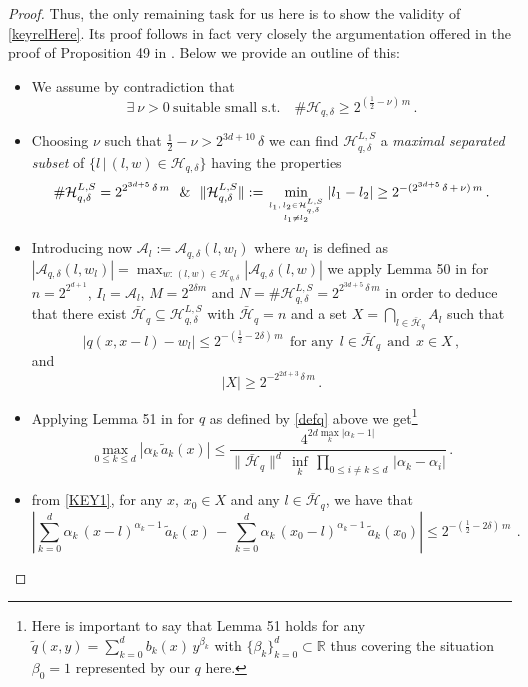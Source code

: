 \documentclass[a4paper,reqno]{amsart}
\numberwithin{equation}{section}
\theoremstyle{definition}
\newcommand{\R}{\mathbb{R}}
\def\beq{\begin{equation}}
\def\eeq{\end{equation}}
\def\beq{\begin{equation}}
\def\eeq{\end{equation}}
\def\a{\alpha}
\def\b{\beta}
\def\A{\mathcal{A}}
\def\beq{\begin{equation}}
\def\eeq{\end{equation}}
\def\beq{\begin{equation}}
\def\eeq{\end{equation}}
\def\d{\delta}
\begin{document}
\begin{proof}
Thus, the only remaining task for us here is to show the validity of \eqref{keyrelHere}. Its proof follows in fact very closely the argumentation offered in the proof of Proposition 49 in \cite{Lie19}. Below we provide an outline of this:
\begin{itemize}
\item We assume by contradiction that
\beq\label{contrad}
\exists\:\nu>0\:\textrm{suitable small s.t.}\quad\#\mathcal{H}_{q,\d}\geq 2^{(\frac{1}{2}-\nu)\,m}\,.
\eeq
\item Choosing $\nu$ such that $\frac{1}{2}-\nu>2^{3d+10}\,\d$ we can find $\mathcal{H}_{q,\d}^{L,S}$ a \emph{maximal separated subset} of  $\{l\,|\,(l,w)\in \mathcal{H}_{q,\d}\}$ having the properties
\beq\label{distribcontr}
\#\mathcal{H}_{q,\d}^{L,S}=2^{2^{3d+5}\,\d\,m}\:\:\:\&\:\:\:\|\mathcal{H}_{q,\d}^{L,S}\|:=
\min_{{l_1,\,l_2\in \mathcal{H}_{q,\d}^{L,S}}\atop{l_1\not=l_2}}|l_1-l_2|\geq 2^{-(2^{3d+5}\,\d\,+\,\nu)\,m}\,.
\eeq
\item Introducing now $\A_l:=\A_{q,\d}(l,w_l)$ where $w_l$ is defined as $|\A_{q,\d}(l,w_l)|=\max_{w:\,(l,w)\in \mathcal{H}_{q,\d}} |\A_{q,\d}(l,w)|$ we apply Lemma 50 in \cite{Lie19} for $n=2^{2^{d+1}}$, $I_l=\A_l$, $M=2^{2\d m}$ and $N=\#\mathcal{H}_{q,\d}^{L,S}=2^{2^{3d+5}\,\d\,m}$ in order to deduce that there exist $\bar{\mathcal{H}}_q\subseteq \mathcal{H}_{q,\d}^{L,S}$ with $\bar{\mathcal{H}}_q=n$ and a set $X=\bigcap_{l\in \bar{\mathcal{H}}_q} A_{l}$ such that
\beq\label{KEY1}
|q(x,x-l)-w_l|\leq 2^{-(\frac{1}{2}-2\d)\,m}\:\:\textrm{for any}\:\:l\in \bar{\mathcal{H}}_q\:\:\textrm{and}\:\:x\in X\,,
\eeq
 and
 \beq\label{KEY2}
|X|\geq 2^{-2^{2d+3}\,\d\,m}\,.
\eeq
\item Applying Lemma 51 in \cite{Lie19} for $q$ as defined by \eqref{defq} above we get\footnote{Here is important to say that Lemma 51 holds for any $\tilde{q}(x,y)=\sum_{k=0}^d b_k(x)\,y^{\b_k}$ with $\{\b_k\}_{k=0}^d\subset\R$ thus covering the situation $\b_0=1$ represented by our $q$ here.}
\beq\label{coefcontrol}
\max_{0\leq k\leq d} |\a_k\,\tilde{a}_k(x)|\leq \frac{4^{2d\max_{k}|\a_k-1|}}{\|\bar{\mathcal{H}}_q\|^d\,\inf_{k}\,\prod_{0\leq i\not=k\leq d}\,|\a_k-\a_i|}\,.
\eeq
\item from \eqref{KEY1}, for any $x,\,x_0\in X$ and any $l\in \bar{\mathcal{H}}_q$, we have that
\beq\label{diff}
|\sum_{k=0}^d \a_k\,(x-l)^{\a_k-1}\,\tilde{a}_k(x)\,-\,\sum_{k=0}^d \a_k\,(x_0-l)^{\a_k-1}\,\tilde{a}_k(x_0)|\leq 2^{-(\frac{1}{2}-2\d)\,m}\:\,.
\eeq


\end{itemize}
\end{proof}
\end{document}
